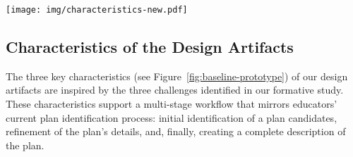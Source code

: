 
\begin{figure*}[ht]
    \centering
    \texttt{[image: img/characteristics-new.pdf]}
    \caption{Illustrations of the three characteristics of the design artifacts, 
    proposed to support instructors' plan identification process by addressing the challenges from our formative study. 
    (A) Instructors can view a vast library of generated programs that achieve a diverse set of tasks in the relevant programming application area to inspire their plan identification; (B) Instructors can compare similar code snippets and other plan components to assist their refinement of plans; and (C) Instructors can follow suggested fields that endorse the structure their final plans should follow.}
    \label{fig:baseline-prototype}
\end{figure*}

\subsection{Characteristics of the Design Artifacts}
\label{sec:design-artifact}

The three key characteristics (see Figure~\ref{fig:baseline-prototype}) of our design artifacts are inspired by the three challenges identified in our formative study. These characteristics support a multi-stage workflow that mirrors educators' current plan identification process: initial identification of a plan candidates, refinement of the plan's details, and, finally, creating a complete description of the plan. 

